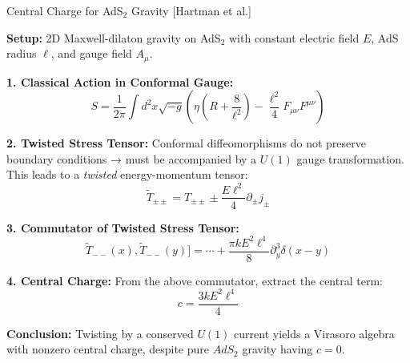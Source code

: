 \begin{frame}[allowframebreaks]{Central Charge for AdS\(_2\) Gravity {\color{red}\scriptsize [Hartman et al.]\cite{Hartman:2008dq}}}
    
\textbf{Setup:} 2D Maxwell-dilaton gravity on AdS\(_2\) with constant electric field \( E \), AdS radius \( \ell \), and gauge field \( A_\mu \).  

\bigskip

\textbf{1. Classical Action in Conformal Gauge:}
\[S = \frac{1}{2\pi} \int d^2x \sqrt{-g} \left( \eta \left(R + \frac{8}{\ell^2} \right) - \frac{\ell^2}{4} F_{\mu\nu}F^{\mu\nu} \right)\]

\textbf{2. Twisted Stress Tensor:}  
Conformal diffeomorphisms do not preserve boundary conditions → must be accompanied by a \( U(1) \) gauge transformation.  
This leads to a \emph{twisted} energy-momentum tensor:
\[\widetilde{T}_{\pm\pm} = T_{\pm\pm} \pm \frac{E \ell^2}{4} \partial_\pm j_\pm\]

\textbf{3. Commutator of Twisted Stress Tensor:}
\[\widetilde{T}_{--}(x), \widetilde{T}_{--}(y)] = \cdots + \frac{\pi k E^2 \ell^4}{8} \partial_y^3 \delta(x - y)\]


\textbf{4. Central Charge:}
From the above commutator, extract the central term:
\[c = \frac{3k E^2 \ell^4}{4}\]

\textbf{Conclusion:}  
Twisting by a conserved \( U(1) \) current yields a Virasoro algebra with nonzero central charge, despite pure \(AdS_2\) gravity having \( c = 0 \).
\end{frame}

